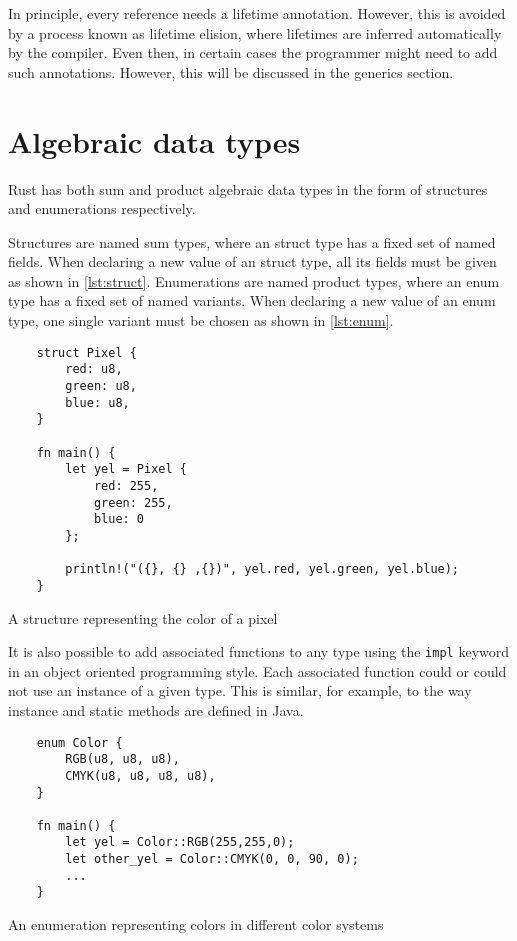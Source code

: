 In principle, every reference needs a lifetime annotation. However, this is
avoided by a process known as lifetime elision, where lifetimes are inferred
automatically by the compiler. Even then, in certain cases the programmer might
need to add such annotations. However, this will be discussed in the generics
section.

\section{Algebraic data types}

Rust has both sum and product algebraic data types in the form of structures and
enumerations respectively.

Structures are named sum types, where an struct type has a fixed set of named
fields. When declaring a new value of an struct type, all its fields must be
given as shown in \ref{lst:struct}. Enumerations are named product types, where
an enum type has a fixed set of named variants. When declaring a new value of an
enum type, one single variant must be chosen as shown in \ref{lst:enum}.

\begin{listing}[ht]
	\begin{verbatim}
    struct Pixel {
        red: u8,
        green: u8,
        blue: u8,
    }

    fn main() {
        let yel = Pixel {
            red: 255,
            green: 255,
            blue: 0
        };

        println!("({}, {} ,{})", yel.red, yel.green, yel.blue);
    }
    \end{verbatim}
  \caption{A structure representing the color of a pixel}
  \label{lst:struct}
\end{listing}

It is also possible to add associated functions to any type using the
\texttt{impl} keyword in an object oriented programming style. Each associated
function could or could not use an instance of a given type. This is similar,
for example, to the way instance and static methods are defined in Java.

\begin{listing}[ht]
	\begin{verbatim}
    enum Color {
        RGB(u8, u8, u8),
        CMYK(u8, u8, u8, u8),
    }

    fn main() {
        let yel = Color::RGB(255,255,0);
        let other_yel = Color::CMYK(0, 0, 90, 0);
        ...
    }
    \end{verbatim}
  \caption{An enumeration representing colors in different color systems}
  \label{lst:enum}
\end{listing}


